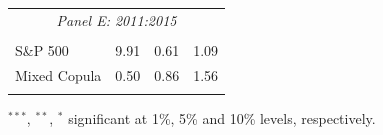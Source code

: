 \documentclass[pdf,9pt,xcolor=dvipsnames,hide notes]{beamer}
\begin{document}
\begin{frame}
\begin{threeparttable}[H]
\begin{tabularx}{\textwidth}{@{\extracolsep{\fill}}llll@{}}
		\multicolumn{4}{c}{\textit{Panel E: 2011:2015}} \\
		&       &       &       \\
		S\&P 500 & 9.91  & 0.61  & 1.09 \\
		Mixed Copula & 0.50  & 0.86  & 1.56 \\
		\multicolumn{1}{r}{} & \multicolumn{1}{r}{} & \multicolumn{1}{r}{} & \multicolumn{1}{r}{} \\
		\bottomrule
	\end{tabularx}%
	\begin{tablenotes}
		\item \scriptsize $^{\ast\ast\ast}$, $^{\ast\ast}$, $^{\ast}$  significant at 1\%, 5\% and 10\% levels, respectively.
	\end{tablenotes}
	\label{tab:table110}%
\end{threeparttable}%

\end{frame}
\end{document}
